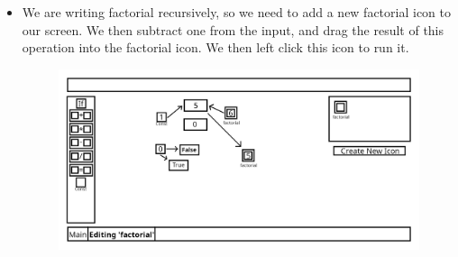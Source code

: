 \documentclass{article}
\begin{document}
\begin{itemize}
            \item
                We are writing factorial recursively, so we need to add a new factorial icon to our screen. We then subtract
                one from the input, and drag the result of this operation into the factorial icon. We then left click this icon
                to run it.
                \begin{figure}[H]
                    \includegraphics[width=\textwidth]{include/example_factorial_add_next_factorial.png}
                    \centering
                \end{figure}


\end{itemize}
\end{document}
